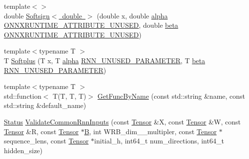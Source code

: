 \begin{DoxyCompactItemize}
\item 
{\footnotesize template$<$$>$ }\\double \mbox{\hyperlink{namespaceonnxruntime_1_1rnn_1_1detail_a44c6b5376a9c12cc3467fcf01243e69c}{Softsign$<$ double $>$}} (double x, double \mbox{\hyperlink{mlasi_8h_a1763355f32e1812e5cb3a0080e7cca12}{alpha}} \mbox{\hyperlink{include_2onnxruntime_2core_2common_2common_8h_a61142a7de4b478dbe3fe741dd928c211}{O\+N\+N\+X\+R\+U\+N\+T\+I\+M\+E\+\_\+\+A\+T\+T\+R\+I\+B\+U\+T\+E\+\_\+\+U\+N\+U\+S\+ED}}, double \mbox{\hyperlink{mlasi_8h_a5fd37d216981b4cd9a19e29b5acd48d4}{beta}} \mbox{\hyperlink{include_2onnxruntime_2core_2common_2common_8h_a61142a7de4b478dbe3fe741dd928c211}{O\+N\+N\+X\+R\+U\+N\+T\+I\+M\+E\+\_\+\+A\+T\+T\+R\+I\+B\+U\+T\+E\+\_\+\+U\+N\+U\+S\+ED}})
\item 
{\footnotesize template$<$typename T $>$ }\\T \mbox{\hyperlink{namespaceonnxruntime_1_1rnn_1_1detail_aaa951c5057c58b7aede3ebb4b2e78866}{Softplus}} (T x, T \mbox{\hyperlink{mlasi_8h_a1763355f32e1812e5cb3a0080e7cca12}{alpha}} \mbox{\hyperlink{rnn__activation__functors_8h_a2f7cd9def0156219f0b79c6ed32a1d22}{R\+N\+N\+\_\+\+U\+N\+U\+S\+E\+D\+\_\+\+P\+A\+R\+A\+M\+E\+T\+ER}}, T \mbox{\hyperlink{mlasi_8h_a5fd37d216981b4cd9a19e29b5acd48d4}{beta}} \mbox{\hyperlink{rnn__activation__functors_8h_a2f7cd9def0156219f0b79c6ed32a1d22}{R\+N\+N\+\_\+\+U\+N\+U\+S\+E\+D\+\_\+\+P\+A\+R\+A\+M\+E\+T\+ER}})
\item 
{\footnotesize template$<$typename T $>$ }\\std\+::function$<$ T(T, T, T)$>$ \mbox{\hyperlink{namespaceonnxruntime_1_1rnn_1_1detail_a96884543f73215f0ac3aa5d6d9a62853}{Get\+Func\+By\+Name}} (const std\+::string \&name, const std\+::string \&default\+\_\+name)
\item 
\mbox{\hyperlink{classonnxruntime_1_1common_1_1Status}{Status}} \mbox{\hyperlink{namespaceonnxruntime_1_1rnn_1_1detail_a789b3f8290ac9eee1219682da56dcc6e}{Validate\+Common\+Rnn\+Inputs}} (const \mbox{\hyperlink{classonnxruntime_1_1Tensor}{Tensor}} \&X, const \mbox{\hyperlink{classonnxruntime_1_1Tensor}{Tensor}} \&W, const \mbox{\hyperlink{classonnxruntime_1_1Tensor}{Tensor}} \&R, const \mbox{\hyperlink{classonnxruntime_1_1Tensor}{Tensor}} $\ast$\mbox{\hyperlink{mlasi_8h_a472f4360dfbf830e5135980ff43484b9}{B}}, int W\+R\+B\+\_\+dim\+\_\+\_\+multipler, const \mbox{\hyperlink{classonnxruntime_1_1Tensor}{Tensor}} $\ast$sequence\+\_\+lens, const \mbox{\hyperlink{classonnxruntime_1_1Tensor}{Tensor}} $\ast$initial\+\_\+h, int64\+\_\+t num\+\_\+directions, int64\+\_\+t hidden\+\_\+size)

\end{DoxyCompactItemize}
